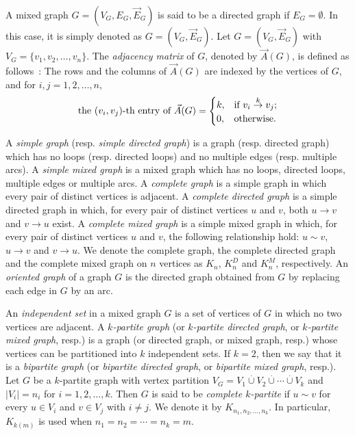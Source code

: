 \documentclass[12pt]{article}
\numberwithin{equation}{section}
\begin{document}

A mixed graph $G=(V_G,E_G,\vec{E}_G)$ is said to be a directed graph if $E_G=\emptyset$. In this case, it is simply denoted as $G=(V_G,\vec{E}_G)$. Let $G=(V_G,\vec{E}_G)$ with $V_G=\{v_1,v_2,\ldots,v_n\}$.
The \textit{adjacency matrix} of $G$, denoted by $\vec{A}(G)$, is defined as follows~\cite{bapatbook}: The rows and the columns of $\vec{A}(G)$ are indexed by the vertices of $G$, and for $i,j=1,2,\ldots,n$,
$$\textnormal{the }(v_i,v_j)\textnormal{-th entry of } \vec{A}(G) =\begin{cases}
k, & \textnormal{if}~v_i\overset{k}{\rightarrow} v_j;\\
0, & \textnormal{otherwise}.
\end{cases}$$

A \textit{simple graph} (resp. \textit{simple directed graph}) is a graph (resp. directed graph) which has no loops (resp. directed loops) and no multiple edges (resp. multiple arcs). A \textit{simple mixed graph} is a mixed graph which has no loops, directed loops, multiple edges or multiple arcs. A \textit{complete graph} is a simple graph in which every pair of distinct vertices is adjacent. A \textit{complete directed graph} is a simple directed graph in which, for every pair of distinct vertices $u$ and $v$, both $u\rightarrow v$ and $v\rightarrow u$ exist. A \textit{complete mixed graph} is a simple mixed graph in which, for every pair of distinct vertices $u$ and $v$, the following relationship hold: $u\sim v$, $u\rightarrow v$ and $v\rightarrow u$. We denote the complete graph, the complete directed graph and the complete mixed graph on $n$ vertices as $K_n$, $K^D_n$ and $K^M_n$, respectively.  An \textit{oriented graph} of a graph $G$ is the directed graph obtained from $G$ by replacing each edge in $G$ by an arc.

An \textit{independent set} in a mixed graph $G$ is a set of vertices of $G$ in which no two vertices are adjacent. A \textit{$k$-partite graph} (or \textit{$k$-partite directed graph}, or \textit{$k$-partite mixed graph}, resp.) is a graph (or directed graph, or mixed graph, resp.) whose vertices can be partitioned into $k$ independent sets. If $k=2$, then we say that it is a \textit{bipartite graph} (or \textit{bipartite directed graph}, or \textit{bipartite mixed graph}, resp.). Let $G$ be a  $k$-partite graph with vertex partition $V_G=V_1\overset{.}{\cup}V_2\overset{.}{\cup}\cdots\overset{.}{\cup}V_k$ and $|V_i|=n_i$ for $i=1,2,\ldots,k$. Then $G$ is said to be \textit{complete $k$-partite} if $u\sim v$ for every $u\in V_i$ and $v\in V_j$ with $i\neq j$. We denote it by $K_{n_1,n_2,\ldots,n_k}$. In particular, $K_{k(m)}$ is used when $n_1=n_2=\cdots=n_k=m$.
\end{document}
